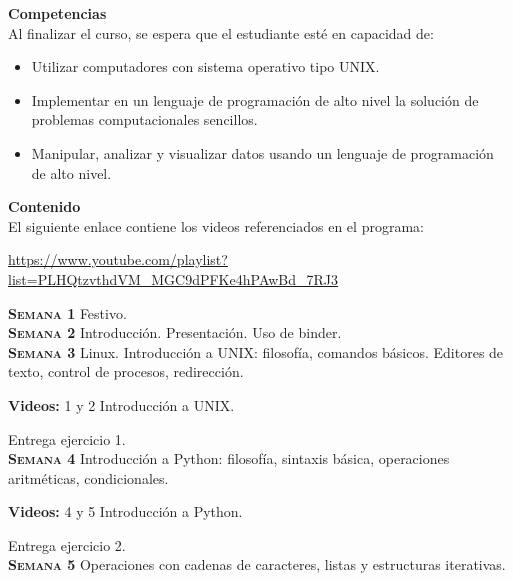 \documentclass[letterpaper,10pt,onecolumn]{article}
\begin{document}
\noindent\textbf{\large {} \quad Competencias}\\[-0.2cm]

\noindent\normalsize Al finalizar el curso, se espera que el estudiante esté en capacidad de:

\begin{itemize}
	\item Utilizar computadores con sistema operativo tipo UNIX.\\[-0.6cm]
	\item Implementar en un lenguaje de programación de alto nivel la solución de problemas computacionales sencillos.\\[-0.6cm]
	\item Manipular, analizar y visualizar datos usando un lenguaje de programación de alto nivel.\\[-0.2cm]
\end{itemize}

\noindent\textbf{\large {} \quad Contenido}\\[-0.2cm]

El siguiente enlace contiene los videos referenciados en el programa:

\url{https://www.youtube.com/playlist?list=PLHQtzvthdVM_MGC9dPFKe4hPAwBd_7RJ3}


\noindent\normalsize \textbf{\textsc{Semana 1}} Festivo.
\\[-0.3cm] 

\noindent\normalsize \textbf{\textsc{Semana 2}}
Introducción. Presentación. Uso de binder.  
\\[-0.3cm] 

\noindent\textbf{\textsc{Semana 3}} Linux.
Introducción a UNIX: filosofía, comandos básicos. 
Editores de texto, control de procesos, redirección.

\textbf{Videos:} 1 y 2 Introducci\'on a UNIX.

Entrega ejercicio 1.
\\[-0.3cm] 

\noindent\textbf{\textsc{Semana 4}} Introducción a Python: filosofía,
sintaxis básica, operaciones aritméticas, condicionales.

\textbf{Videos:} 4 y 5 Introducci\'on a Python.

Entrega ejercicio 2.
\\[-0.3cm]   

\noindent\textbf{\textsc{Semana 5}} Operaciones con cadenas de
caracteres, listas y estructuras iterativas.
\end{document}
